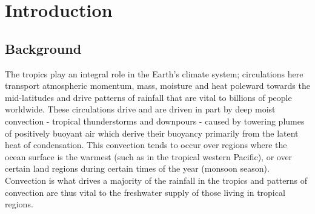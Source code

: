 \documentclass[letterpaper,12pt,titlepage,oneside,final]{book}
\begin{document}
 

\chapter{Introduction}\label{intro}
\section{Background}\label{background}

The tropics play an integral role in the Earth's climate system; circulations here transport atmospheric momentum, mass, moisture and heat poleward towards the mid-latitudes and drive patterns of rainfall that are vital to billions of people worldwide. These circulations drive and are driven in part by deep moist convection - tropical thunderstorms and downpours - caused by towering plumes of positively buoyant air which derive their buoyancy primarily from the latent heat of condensation. This convection tends to occur over regions where the ocean surface is the warmest (such as in the tropical western Pacific), or over certain land regions during certain times of the year (monsoon season). Convection is what drives a majority of the rainfall in the tropics and patterns of convection are thus vital to the freshwater supply of those living in tropical regions.
\end{document}
